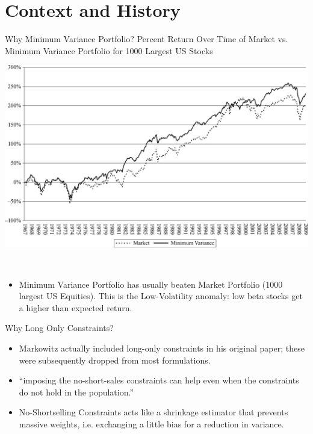 \documentclass[11pt,leqno]{beamer}
\begin{document}
\section{Context and History}
\begin{frame}{Why Minimum Variance Portfolio?}
Percent Return Over Time of Market vs. Minimum Variance Portfolio  for 1000 Largest US Stocks 
\begin{centering}
\includegraphics[scale=0.5]{CDPic.jpg}\\
\cite{c31}
\end{centering}\\
\begin{itemize}
\item Minimum Variance Portfolio has usually beaten Market Portfolio (1000 largest US Equities).  This is the Low-Volatility anomaly: low beta stocks get a higher than expected return.
\end{itemize}
\end{frame}

\begin{frame}{Why Long Only Constraints?}
\begin{itemize}
\item Markowitz actually included long-only constraints in his original paper; these were subsequently dropped from most formulations.
\item``imposing the no-short-sales constraints can help even when the constraints do not hold in the population.'' \cite{jnma}
\item No-Shortselling Constraints acts like a shrinkage estimator that prevents massive weights, i.e. exchanging a little bias for a reduction in variance.
\end{itemize}

\end{frame}
\end{document}

